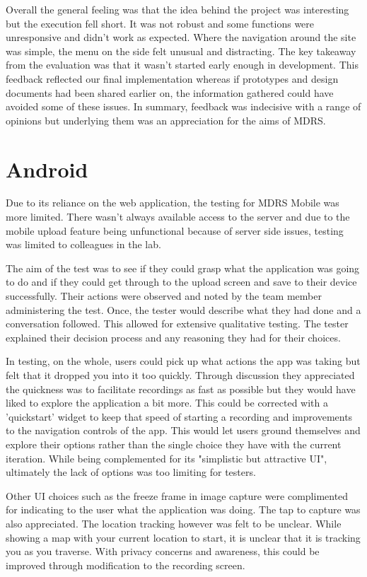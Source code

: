 \documentclass{l3proj}
\begin{document}
Overall the general feeling was that the idea behind the project was interesting but the execution fell short. It was not robust and some functions were unresponsive and didn't work as expected. Where the navigation around the site was simple, the menu on the side felt unusual and distracting. The key takeaway from the evaluation was that it wasn't started early enough in development. This feedback reflected our final implementation whereas if prototypes and design documents had been shared earlier on, the information gathered could have avoided some of these issues. In summary, feedback was indecisive with a range of opinions but underlying them was an appreciation for the aims of MDRS.

\section{Android}		Due to its reliance on the web application, the testing for MDRS Mobile was more limited. There wasn't always available access to the server and due to the mobile upload feature being unfunctional because of server side issues, testing was limited to colleagues in the lab.

The aim of the test was to see if they could grasp what the application was going to do and if they could get through to the upload screen and save to their device successfully. Their actions were observed and noted by the team member administering the test. Once, the tester would describe what they had done and a conversation followed. This allowed for extensive qualitative testing. The tester explained their decision process and any reasoning they had for their choices.

In testing, on the whole, users could pick up what actions the app was taking but felt that it dropped you into it too quickly. Through discussion they appreciated the quickness was to facilitate recordings as fast as possible but they would have liked to explore the application a bit more. This could be corrected with a 'quickstart' widget to keep that speed of starting a recording and improvements to the navigation controls of the app. This would let users ground themselves and explore their options rather than the single choice they have with the current iteration. While being complemented for its "simplistic but attractive UI", ultimately the lack of options was too limiting for testers.

Other UI choices such as the freeze frame in image capture were complimented for indicating to the user what the application was doing. The tap to capture was also appreciated. The location tracking however was felt to be unclear. While showing a map with your current location to start, it is unclear that it is tracking you as you traverse. With privacy concerns and awareness, this could be improved through modification to the recording screen.
\end{document}
